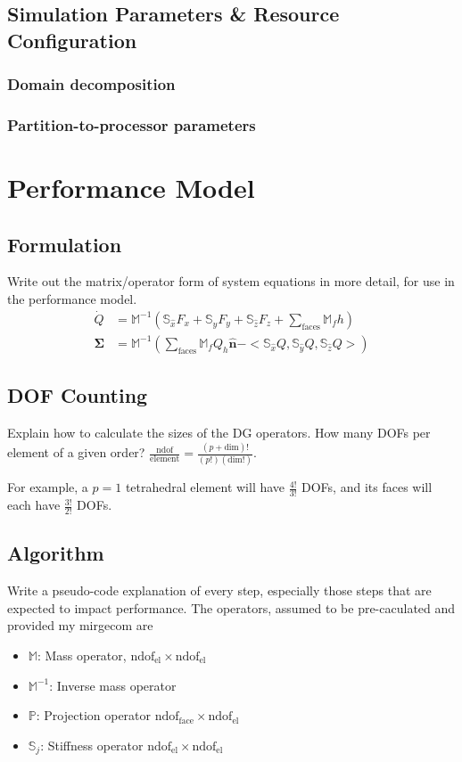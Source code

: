 \documentclass[11pt]{article}
\begin{document}
\subsection{Simulation Parameters \& Resource Configuration}

\subsubsection{Domain decomposition}

\subsubsection{Partition-to-processor parameters}

\section{Performance Model}
\subsection{Formulation}
Write out the matrix/operator form of system equations in more detail, for use in the performance model.
\begin{align}
  \dot{Q} &= \mathbb{M}^{-1}\left(\mathbb{S}_{\hat{x}} F_x + \mathbb{S}_{\hat{y}} F_y + \mathbb{S}_{\hat{z}} F_z + \sum_\text{faces} \mathbb{M}_f h\right) \\
  \mathbf{\Sigma} &= \mathbb{M}^{-1}\left(\sum_{\text{faces}}{\mathbb{M}_f Q_h\hat{\mathbf{n}}} - <\mathbb{S}_{\hat{x}} Q, \mathbb{S}_{\hat{y}}Q, \mathbb{S}_{\hat{z}}Q>\right)
\end{align}
\subsection{DOF Counting}
Explain how to calculate the sizes of the DG operators.  How many DOFs per element of a given order? $\frac{\text{ndof}}{\text{element}}=\frac{(p+\text{dim})!}{(p!)(\text{dim}!)}$.

For example, a $p=1$ tetrahedral element will have $\frac{4!}{3!}$ DOFs, and its faces will each have $\frac{3!}{2!}$ DOFs.

\subsection{Algorithm}
Write a pseudo-code explanation of every step, especially those steps that are expected to impact performance.  The operators, assumed to be pre-caculated and provided my mirgecom are
\begin{itemize}
\item $\mathbb{M}$: Mass operator, $\text{ndof}_\text{el} \times \text{ndof}_\text{el}$
\item $\mathbb{M}^{-1}$: Inverse mass operator
\item $\mathbb{P}$: Projection operator $\text{ndof}_\text{face} \times \text{ndof}_\text{el}$
\item $\mathbb{S}_j$: Stiffness operator $\text{ndof}_\text{el} \times \text{ndof}_\text{el}$
\end{itemize}
\end{document}
